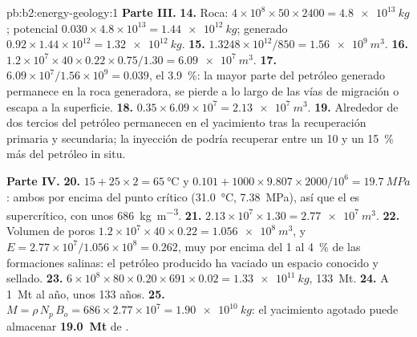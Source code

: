 \begin{solution}{pb:b2:energy-geology:1}
\noindent\textbf{Parte III.}
\textbf{14.} Roca: $4 \times 10^8 \times 50 \times 2400 = \qty{4.8e13}{kg}$; potencial $0.030
\times 4.8 \times 10^{13} = \qty{1.44e12}{kg}$; generado $0.92 \times 1.44 \times 10^{12} =
\qty{1.32e12}{kg}$.
\textbf{15.} $1.3248 \times 10^{12}/850 = \qty{1.56e9}{m^3}$.
\textbf{16.} $1.2 \times 10^7 \times 40 \times 0.22 \times 0.75/1.30 = \qty{6.09e7}{m^3}$.
\textbf{17.} $6.09 \times 10^7/1.56 \times 10^9 = 0.039$, el \qty{3.9}{\percent}: la mayor parte del petróleo generado
permanece en la roca generadora, se pierde a lo largo de las vías de migración o escapa a la superficie.
\textbf{18.} $0.35 \times 6.09 \times 10^7 = \qty{2.13e7}{m^3}$.
\textbf{19.} Alrededor de dos tercios del petróleo permanecen en el yacimiento tras la recuperación primaria y
secundaria; la inyección de  podría recuperar entre un 10 y un \qty{15}{\percent} más del petróleo in situ.

\noindent\textbf{Parte IV.}
\textbf{20.} $15 + 25 \times 2 = \qty{65}{\celsius}$ y $0.101 + 1000 \times 9.807 \times 2000/10^6
= \qty{19.7}{MPa}$: ambos por encima del punto crítico (\qty{31.0}{\celsius}, \qty{7.38}{MPa}), así que el
 es supercrítico, con unos \qty{686}{kg.m^{-3}}.
\textbf{21.} $2.13 \times 10^7 \times 1.30 = \qty{2.77e7}{m^3}$.
\textbf{22.} Volumen de poros $1.2 \times 10^7 \times 40 \times 0.22 = \qty{1.056e8}{m^3}$, y $E =
2.77 \times 10^7/1.056 \times 10^8 = 0.262$, muy por encima del 1 al \qty{4}{\percent} de las formaciones
salinas: el petróleo producido ha vaciado un espacio conocido y sellado.
\textbf{23.} $6 \times 10^8 \times 80 \times 0.20 \times 691 \times 0.02 = \qty{1.33e11}{kg}$,
\qty{133}{Mt}.
\textbf{24.} A \qty{1}{Mt} al año, unos 133 años.
\textbf{25.} $M = \rho\,N_p\,B_o = 686 \times 2.77 \times 10^7 = \qty{1.90e10}{kg}$: el yacimiento agotado
puede almacenar \textbf{\qty[text-series-to-math=true]{19.0}{Mt}} de .
\end{solution}

